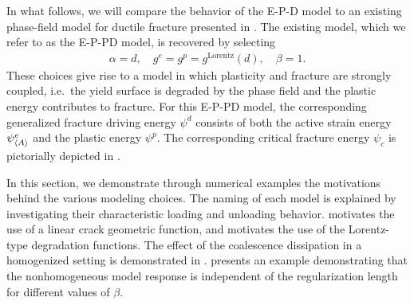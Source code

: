 In what follows, we will compare the behavior of the E-P-D model to an existing phase-field model for ductile fracture presented in \cite{brandon2020cohesive}.  The existing model,
which we refer to as the E-P-PD model,  is recovered by selecting
\begin{align*}
  \alpha = d, \quad g^e = g^p = g^\text{Lorentz}(d), \quad \beta = 1.
\end{align*}
These choices give rise to a model in which plasticity and fracture are strongly coupled, i.e.\ the yield surface is degraded by the phase field and the plastic energy contributes to fracture. For this E-P-PD model, the corresponding generalized fracture driving energy $\psi^d$ consists of both the active strain energy $\psi^e_{\left< A \right>}$ and the plastic energy $\psi^p$.  The corresponding critical fracture energy $\psi_c$ is pictorially depicted in .

In this section, we demonstrate through numerical examples the motivations behind the various modeling choices. The naming of each model is explained  by investigating their characteristic loading and unloading behavior.  motivates the use of a linear crack geometric function, and  motivates the use of the Lorentz-type degradation functions.
The effect of the coalescence dissipation in a homogenized setting is demonstrated in .
 presents an example demonstrating that the nonhomogeneous model response is independent of the regularization length for different values of $\beta$.

